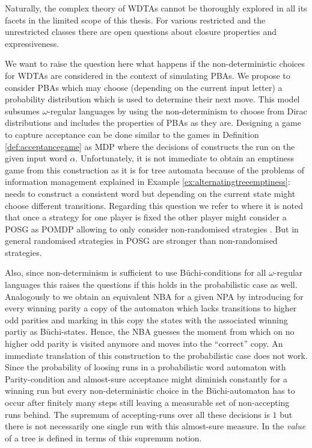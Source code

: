 Naturally, the complex theory of \acp{WDTA} cannot be thoroughly explored in
all its facets in the limited scope of this thesis. For various restricted and
the unrestricted classes there are open questions about closure properties and
expressiveness.

We want to raise the question here what happens if the non-deterministic
choices for \acp{WDTA} are considered in the context of simulating \acp{PBA}.
We propose to consider \acp{PBA} which may choose (depending on the current
input letter) a probability distribution which is used to determine their next
move. This model subsumes $\omega$-regular languages by using the
non-determinism to choose from Dirac distributions and includes the properties
of \acp{PBA} as they are. Designing a game to capture acceptance can be done
similar to the games in Definition \ref{def:acceptancegame} as \ac{MDP} where
the decisions of \eve{} constructs the run on the given input word $\alpha$.
Unfortunately, it is not immediate to obtain an emptiness game from this
construction as it is for tree automata because of the problems of information
management explained in Example \ref{ex:alternatingtreeemptiness}: \eve{} needs
to construct a consistent word but depending on the current state might choose
different transitions. Regarding this question we refer to
\cite{AlgorithmsForPOSG} where it is noted that once a strategy for one player
is fixed the other player might consider a \ac{POSG} as \ac{POMDP} allowing to
only consider non-randomised strategies \cite{RandomnessForFree}. But in
general randomised strategies in \ac{POSG} are stronger than non-randomised
strategies.

Also, since non-determinism is sufficient to use
Büchi-conditions for all $\omega$-regular languages this raises the questions
if this holds in the probabilistic case as well.
Analogously to \cite[Theorem 1.10]{AutoLogInfGames} we obtain an equivalent
\ac{NBA} for a given \ac{NPA} by introducing for every winning parity a copy of
the automaton which lacks transitions to higher odd parities and marking in
this copy the states with the associated winning partiy as Büchi-states. Hence,
the \ac{NBA} guesses the moment from which on no higher odd parity is visited
anymore and moves into the \enquote{correct} copy. An immediate translation of
this construction to the probabilistic case does not work. Since the
probability of loosing runs in a probabilistic word automaton with
Parity-condition and almost-sure acceptance might diminish constantly for a
winning run but every non-deterministic choice in the Büchi-automaton has to
occur after finitely many steps still leaving a measurable set of non-accepting
runs behind. The supremum of accepting-runs over all these decisions is $1$ but
there is not necessarily one single run with this almost-sure measure. In
\cite{RandAutoInfTrees} the \emph{value} of a tree is defined in terms of this
supremum notion.

